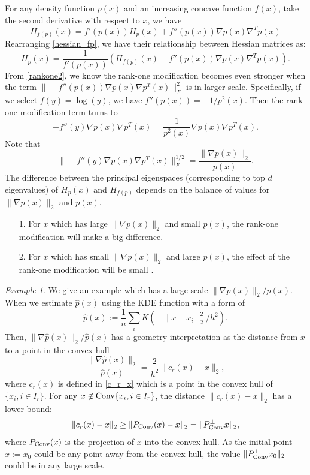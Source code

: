 \documentclass[aos,preprint]{imsart}
\theoremstyle{remark}
\newtheorem*{example}{Example}
\begin{document}
For any density function $p(x)$ and an increasing concave function $f(x)$, take the second derivative with respect to $x$, we have
\begin{equation}\label{hessian_fp}
H_{f(p)}(x) = f'(p(x)) H_p(x) +f''(p(x)) \nabla p(x)\nabla^T p(x)
\end{equation}
Rearranging \eqref{hessian_fp}, we have their relationship between Hessian matrices as:
\begin{equation}\label{rankone2}
 H_{p}(x) =\frac{1}{ f'(p(x))} (H_{f(p)}(x) - f''(p(x))\nabla p(x) \nabla^T p(x)) .
\end{equation}
From \eqref{rankone2}, we know the rank-one modification becomes even stronger when the term $\|-f''(p(x))\nabla p(x) \nabla p^T(x)\|_F^2$ is in larger scale. Specifically, if we select $f(y) = \log(y)$, we have $f''(p(x))=-1/p^2(x)$. Then the rank-one modification term turns to
\[
-f''(y)\nabla p(x) \nabla p^T(x) = \frac{1}{p^2(x)} \nabla p(x) \nabla p^T(x).
\]
Note that
\[
\|-f''(y)\nabla p(x) \nabla p^T(x)\|_F^{1/2} = \frac{\|\nabla p(x)\|_2}{p(x)}.
\]
The difference between the principal eigenspaces (corresponding to top $d$ eigenvalues) of  $H_p(x)$ and $H_{f(p)}$ depends on the balance of values for $\|\nabla p(x)\|_2$ and $p(x)$.
\begin{itemize}
\item[1.] For $x$ which has large $\|\nabla p(x)\|_2$ and small $p(x)$, the rank-one modification will make a big difference.
\item[2.] For $x$ which has small $\|\nabla p(x)\|_2$ and large $p(x)$, the effect of the rank-one modification will be small .
\end{itemize}
\begin{example}
We give an example which has a large scale $\|\nabla p(x)\|_2/p(x)$. When we estimate $\hat{p}(x)$ using the KDE function with a form of 
\[
\hat{p}(x):=  \frac{1}{n} \sum_i K(-\|x-x_i\|_2^2/h^2).
\]
Then, $\|\nabla \hat{p}(x)\|_2/\hat{p}(x)$ has a geometry interpretation as the distance from $x$ to a point in the convex hull
\[
\frac{\|\nabla \hat{p}(x)\|_2}{\hat{p}(x)} = \frac{2}{h^2} \|c_r(x)-x\|_2,
\]
where $c_r(x)$ is defined in \eqref{c_r_x} which is a point
in the convex hull of $\{x_i, i\in I_r\}$. For any $x\not \in {\rm Conv}\{x_i, i\in I_r \}$, the distance $\|c_r(x) -x\|_2$ has a lower bound:
\[
\|c_r(x) -x\|_2 \geq \|{ P}_{\rm Conv} (x) -x\|_2 = \|{ P}^{\perp}_{\rm Conv} x\|_2,
\]
where ${P}_{\rm Conv}(x)$ is the projection of $x$ into the convex hull. %
As the initial point $x:=x_0$ could be any point away from the convex hull, the value $\|{ P}^{\perp}_{\rm Conv} x_0\|_2$ could be in any large scale.
\end{example}
\end{document}
